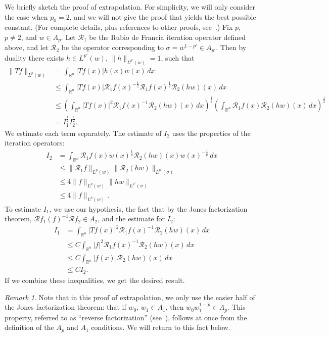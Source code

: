 \documentclass[12pt]{amsart}
\theoremstyle{definition}
\theoremstyle{remark}
\newtheorem{remark}[theorem]{Remark}
\numberwithin{equation}{section}
\newcommand{\rn}{{{\mathbb R}^n}}
\newcommand{\Rdf}{\mathcal{R}}
\begin{document}
  We briefly sketch the proof of extrapolation.  For simplicity,
  we will only consider the case when $p_0=2$, and we will not give
  the proof that yields the best possible constant.  (For complete
  details, plus references to other proofs,
  see~\cite{dcu-paseky,cruz-martell-perezBook}.)  Fix $p$, $p\neq 2$,
  and $w\in A_p$.   Let $\Rdf_1$ be the Rubio de Francia iteration
  operator defined above, and let $\Rdf_2$ be the operator
  corresponding to $\sigma=w^{1-p'} \in A_{p'}$.  Then by duality
  there exists $h\in L^{p'}(w)$, $\|h\|_{L^{p'}(w)}=1$, such that 
%
\begin{align*}
  \|Tf\|_{L^p(w)}
  & = \int_\rn |Tf(x)| h(x)w(x)\,dx \\
& \leq \int_\rn |Tf(x)| 
\Rdf_1f(x)^{-\frac{1}{2}} \Rdf_1f(x)^{\frac{1}{2}}   \Rdf_2 (hw)(x)\,dx \\
& \leq \left(\int_\rn |Tf(x)|^2 \Rdf_1f(x)^{-1} \Rdf_2
  (hw)(x)\,dx\right)^{\frac{1}{2}} 
\left(\int_\rn \Rdf_1f(x) \Rdf_2 (hw)(x)\,dx \right) ^{\frac{1}{2}} \\
& = I_1 ^{\frac{1}{2}} I_2 ^{\frac{1}{2}}. 
\end{align*}
%
We estimate each term separately.  The estimate of $I_2$ uses the properties of the
iteration operators:
%
\begin{align*}
  I_2
  & = \int_\rn \Rdf_1f(x) w(x)^{\frac{1}{p}}\Rdf_2 (hw)(x)
      w(x)^{-\frac{1}{p}}\,dx \\ 
& \leq \|\Rdf_1f\|_{L^p(w)} 
\|\Rdf_2(hw)\|_{L^{p'}(\sigma)} \\
& \leq 4\|f\|_{L^p(w)} \|hw\|_{L^{p'}(\sigma)}\\
& \leq 4\|f\|_{L^p(w)}.
\end{align*}
%
To estimate $I_1$, we use our hypothesis, the fact that by the
Jones factorization theorem, $\Rdf f_1(f)^{-1} \Rdf f_2\in A_2$,  and the
estimate for $I_2$:
%
\begin{align*}
  I_1
  & = \int_\rn |Tf(x)|^2 \Rdf_1f(x)^{-1} \Rdf_2
  (hw)(x)\,dx \\
& \leq C \int_\rn |f|^2 \Rdf_1f(x)^{-1} \Rdf_2
  (hw)(x)\,dx \\
& \leq C \int_\rn |f(x)|\Rdf_2
  (hw)(x)\,dx \\
& \leq CI_2.
\end{align*}
%
If we combine these inequalities, we get the desired result.

\begin{remark}
  Note that in this proof of extrapolation, we only use the easier
  half of the Jones factorization theorem:  that if $w_0,\,w_1\in
  A_1$, then $w_0w_1^{1-p} \in A_p$.  This property, referred to as
  ``reverse factorization'' (see~\cite{cruz-martell-perezBook}),
  follows at once from the definition of the $A_p$ and $A_1$
  conditions.  We will return to this fact below.
\end{remark}
\end{document}
